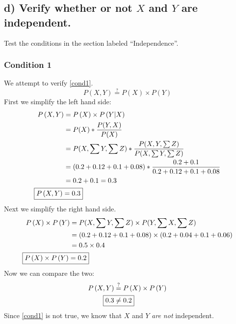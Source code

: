 \documentclass[12pt,letterpaper]{article}
\begin{document}
\subsection{d) Verify whether or not $X$ and $Y$ are independent.}
Test the conditions in the section labeled ``Independence''.
\subsubsection*{Condition 1}
We attempt to verify \eqref{cond1}.
\begin{equation*}
P\left(X,Y\right)\stackrel{?}{=}P\left(X\right)\times P\left(Y\right)
\end{equation*}
First we simplify the left hand side:
\begin{align*}
P\left(X,Y\right)&=P\left(X\right)\times P\left(Y\middle|X\right)\\
&= P(X)*\frac{P(Y,X)}{P(X)}\\
&= P(X,\sum{Y},\sum{Z})*\frac{P(X,Y,\sum{Z})}{P(X,\sum{Y},\sum{Z})}\\
&= \left(0.2+0.12+0.1+0.08\right)*\frac{0.2+0.1}{0.2+0.12+0.1+0.08}\\
&= 0.2+0.1 = 0.3\\
\Aboxed{P\left(X,Y\right) &= 0.3}
%
\end{align*}
Next we simplify the right hand side.
\begin{align*}
P\left(X\right)\times P\left(Y\right) &= P(X,\sum{Y},\sum{Z}) \times P(Y,\sum{X},\sum{Z})\\
&= \left(0.2+0.12+0.1+0.08\right) \times \left(0.2+0.04+0.1+0.06\right)\\
&= 0.5 \times 0.4\\
\Aboxed{P\left(X\right)\times P\left(Y\right) &= 0.2}
%
\end{align*}
Now we can compare the two:
\begin{align*}
P\left(X,Y\right)&\stackrel{?}{=}P\left(X\right)\times P\left(Y\right)\\
\Aboxed{0.3 &\neq 0.2}
\end{align*}
Since \eqref{cond1} is not true, we know that $X$ and $Y$ \emph{are not} independent.
\end{document}
